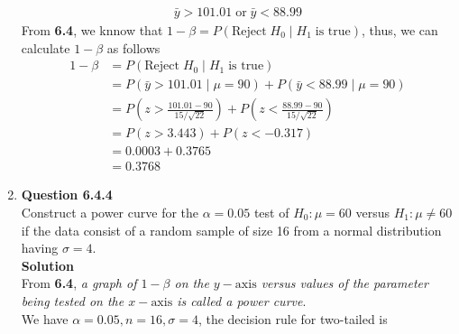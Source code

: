 \documentclass{uofa-eng-assignment}
\begin{document}
\begin{enumerate}
\begin{align*}
            \bar{y} > 101.01\;\text{or}\;\bar{y} < 88.99
        \end{align*}
        From \textbf{6.4}, we knnow that $1 - \beta = P(\text{Reject}\;H_0\;|\;H_1\;\text{is true})$, thus, we can
        calculate $1 - \beta$ as follows
        \begin{align*}
            1 - \beta & = P(\text{Reject}\;H_0\;|\;H_1\;\text{is true})                                       \\
                      & = P(\bar{y} > 101.01\;|\;\mu = 90) + P(\bar{y} < 88.99\;|\;\mu = 90)                  \\
                      & = P(z > \frac{101.01 - 90}{15 / \sqrt{22}}) + P(z <\frac{88.99 - 90}{15 / \sqrt{22}}) \\
                      & = P(z > 3.443) +  P(z < -0.317)                                                       \\
                      & = 0.0003 + 0.3765                                                                     \\
                      & = \boldsymbol{0.3768}
        \end{align*}
    \item[]
        \textbf{Question 6.4.4} \\
        Construct a power curve for the $\alpha = 0.05$ test of $H_0\!:\mu = 60$ versus $H_1\!:\mu \neq 60$
        if the data consist of a random sample of size 16 from a normal distribution having $\sigma = 4$. \\
        \newpage
        \textbf{Solution} \\
        From \textbf{6.4}, \textit{a graph of $1 - \beta$ on the $y\!-\!\text{axis}$
            versus values of the parameter being tested on the $x\!-\!\text{axis}$ is called a power curve}. \\
        We have $\alpha = 0.05, n = 16, \sigma = 4$, the decision rule for two-tailed is
        \begin{align*}

\end{align*}
\end{enumerate}
\end{document}
